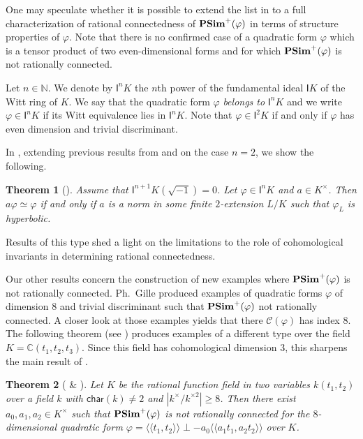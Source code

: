 \documentclass[twoside,11pt]{amsart}
\newtheorem{thmI}{Theorem}
\numberwithin{equation}{section}
\theoremstyle{definition}
\newcommand{\car}{\mathsf{char}}
\newcommand{\vf}{\varphi}
\newcommand{\mg}[1]{{#1}^{\times}}
\newcommand{\sq}[1]{{#1}^{\times 2}}
\newcommand{\scg}[1]{\mg{#1}/\sq{#1}}
\newcommand{\nat}{\mathbb{N}}
\newcommand{\la}{\langle}
\newcommand{\ra}{\rangle}
\newcommand{\lla}{\la\!\la}
\newcommand{\rra}{\ra\!\ra}
\renewcommand{\geq}{\geqslant}
\newcommand{\I}{\mathsf{I}}
\newcommand{\mc}{\mathcal}
\renewcommand{\geq}{\geqslant}
\newcommand{\cc}{\mathbb{C}}
\begin{document}
One may speculate whether it is possible to extend the list in  to a full characterization of rational connectedness of ${\bf PSim}^+(\vf)$ in terms of structure properties of $\vf$.
Note that there is no confirmed case of a quadratic form $\vf$ which is a  tensor product of two even-dimensional forms and for which ${\bf PSim}^+(\vf)$ is not rationally connected.

Let $n\in\nat$. We denote by $\I^nK$ the $n$th power of the fundamental ideal $\I K$ of the Witt ring of $K$.
We say that the quadratic form $\vf$ \emph{belongs to} $\I^nK$ and we write $\vf\in\I^n K$ if its Witt equivalence lies in $\I^n K$.
Note that $\vf\in\I^2K$ if and only if $\vf$ has even dimension and trivial discriminant. 

In , extending previous results from \cite{KP08} and \cite{AP22} on the case $n=2$, we show the following.

\begin{thmI}[]\label{T5}
    Assume that $\I^{n+1} K(\sqrt{-1})=0$.
    Let $\varphi\in\I^nK$ and $a\in\mg{K}$.
    Then $a\varphi\simeq \varphi$ if and only if $a$ is a norm in some finite $2$-extension $L/K$ such that $\varphi_L$ is hyperbolic.
\end{thmI} 

Results of this type shed a light on the limitations to the  role of cohomological invariants in determining rational connectedness.


Our other results concern the construction of new examples where ${\bf PSim}^+(\vf)$ is not rationally connected.
Ph.~Gille \cite{Gil97} produced examples of quadratic forms $\vf$ of dimension $8$ and trivial discriminant such that ${\bf PSim}^+(\varphi)$ not rationally connected. 
A closer look at those examples yields that there $\mc{C}(\vf)$ has index $8$.
The following theorem (see ) produces examples of a different type over the field $K=\cc(t_1,t_2,t_3)$.
Since this field has cohomological dimension $3$, this sharpens the main result of \cite{Gil97}.

\begin{thmI}[ \& ]\label{T3}
    Let $K$ be the rational function field in two variables $k(t_1,t_2)$ over a field $k$ with $\car(k)\neq 2$ and $|\scg{k}|\geq 8$.
    Then there exist $a_0,a_1,a_2\in \mg{K}$ such that ${\bf PSim}^+(\varphi)$ is not rationally connected for the $8$-dimensional quadratic form $\vf=\lla t_1,t_2\rra\perp -a_0\lla a_1t_1,a_2t_2\rra$ over $K$.
\end{thmI}
\end{document}
